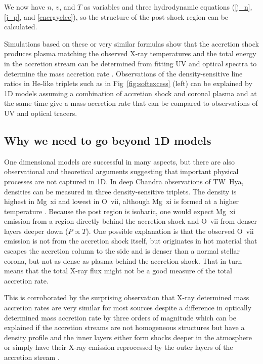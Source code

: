We now have $n$, $v$, and $T$ as variables and three hydrodynamic equations (\ref{j_n}, \ref{j_p}, and \ref{energyelec}), so the structure of the post-shock region can be calculated.

Simulations based on these or very similar formulas show that the accretion shock produces plasma matching the observed X-ray temperatures \citep{lamzin_1998} and the total energy in the accretion stream can be determined from fitting UV and optical spectra to determine the mass accretion rate \citep{calvet_1998}. Observations of the density-sensitive line ratios in He-like triplets such as in Fig~\ref{fig:softexcess} (left) can be explained by 1D models assuming a combination of accretion shock and coronal plasma \cite{Guenther_2007} and at the same time give a mass accretion rate that can be compared to observations of UV and optical tracers.


\subsection{Why we need to go beyond 1D models}
One dimensional models are successful in many aspects, but there are also observational and theoretical arguments suggesting that important physical processes are not captured in 1D. In deep Chandra observations of TW~Hya, densities can be measured in three density-sensitive triplets. The density is highest in Mg~{\sc xi} and lowest in O~{\sc vii}, although Mg~{\sc xi} is formed at a higher temperature \cite{Brickhouse_2010}. Because the post region is isobaric, one would expect Mg~{\sc xi} emission from a region directly behind the accretion shock and O~{\sc vii} from denser layers deeper down ($P\propto T$). One possible explanation is that the observed O~{\sc vii} emission is not from the accretion shock itself, but originates in hot material that escapes the accretion column to the side and is denser than a normal stellar corona, but not as dense as plasma behind the accretion shock. That in turn means that the total X-ray flux might not be a good measure of the total accretion rate.

This is corroborated by the surprising observation that X-ray determined mass accretion rates are very similar for most sources despite a difference in optically determined mass accretion rate by three orders of magnitude \cite{2011A&A...526A.104C} which can be explained if the accretion streams are not homogeneous structures but have a density profile and the inner layers either form shocks deeper in the atmosphere or simply have their X-ray emission reprocessed by the outer layers of the accretion stream \cite{2018A&A...618A..55S,2021Natur.597...41E}.

